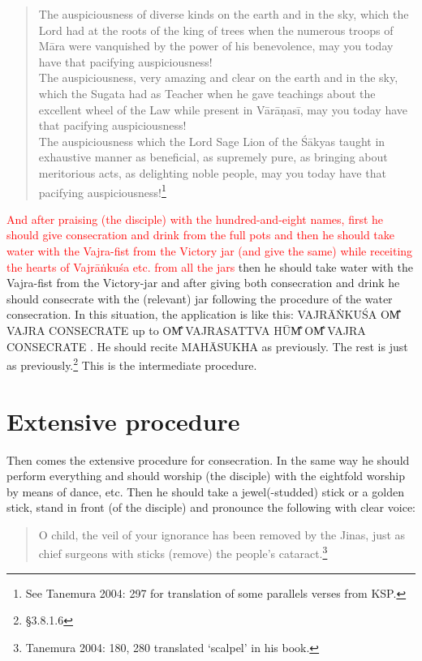 \documentclass[11pt]{book}
\makeatletter
\def\fakesc#1{%
  \begingroup%
  \xdef\fake@name{\csname\curr@fontshape/\f@size\endcsname}%
  \fontsize{1.3\fontdimen8\fake@name}{\baselineskip}\selectfont%
  \uppercase{#1}%
  \endgroup%
}
\newcommand{\mantra}[1]{\fakesc{#1}}
\newcommand{\red}[1]{\textcolor{red}{#1}}
\makeatother
\begin{document}
\begin{verse}
The auspiciousness of diverse kinds on the earth and in the sky, which the Lord had at the roots of the king of trees when the numerous troops of Māra were vanquished by the power of his benevolence, may you today have that pacifying auspiciousness!\\
The auspiciousness, very amazing and clear on the earth and in the sky, which the Sugata had as Teacher when he gave teachings about the excellent wheel of the Law while present in Vārāṇasī, may you today have that pacifying auspiciousness!\\
The auspiciousness which the Lord Sage Lion of the Śākyas taught in exhaustive manner as beneficial, as supremely pure, as bringing about meritorious acts, as delighting noble people, may you today have that pacifying auspiciousness!\footnote{See Tanemura 2004: 297 for translation of some parallels verses from KSP.}\\
\end{verse}

\red{And after praising (the disciple) with the hundred-and-eight names, first he should give consecration and drink from the full pots and then he should take water with the Vajra-fist from the Victory jar (and give the same) while receiting the hearts of Vajrāṅkuśa etc. from all the jars}
then he should take water with the Vajra-fist from the Victory-jar
and after giving both consecration and drink he should consecrate with the (relevant) jar following the procedure of the water consecration. In this situation, the application is like this: \mantra{vajrāṅkuśa om̐ vajra consecrate} up to \mantra{om̐ vajrasattva hūm̐ om̐ vajra consecrate}. He should recite \mantra{mahāsukha} as previously. The rest is just as previously.\footnote{§3.8.1.6} This is the intermediate procedure.

\section{Extensive procedure}
Then comes the extensive procedure for consecration. In the same way he should perform everything and should worship (the disciple) with the eightfold worship by means of dance, etc. Then he should take a jewel(-studded) stick or a golden stick, stand in front (of the disciple) and  pronounce the following with clear voice:

\begin{verse}
O child, the veil of your ignorance has been removed by the Jinas, just as chief surgeons with sticks (remove) the people's cataract.\footnote{Tanemura 2004: 180, 280 translated `scalpel' in his book.}
\end{verse}
\end{document}
